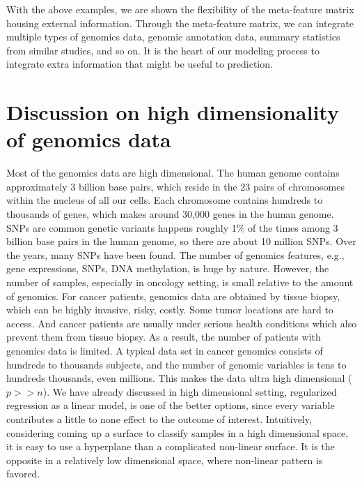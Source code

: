 With the above examples, we are shown the flexibility of the meta-feature matrix housing external information. Through the meta-feature matrix, we can integrate multiple types of genomics data, genomic annotation data, summary statistics from similar studies, and so on. It is the heart of our modeling process to integrate extra information that might be useful to prediction.

\section*{Discussion on high dimensionality of genomics data}
Most of the genomics data are high dimensional. The human genome contains approximately 3 billion base pairs, which reside in the 23 pairs of chromosomes within the nucleus of all our cells. Each chromosome contains hundreds to thousands of genes, which makes around 30,000 genes in the human genome. SNPs are common genetic variants happens roughly 1\% of the times among 3 billion base pairs in the human genome, so there are about 10 million SNPs. Over the years, many SNPs have been found. The number of genomics features, e.g., gene expressions, SNPs, DNA methylation, is huge by nature. However, the number of samples, especially in oncology setting, is small relative to the amount of genomics. For cancer patients, genomics data are obtained by tissue biopsy, which can be highly invasive, risky, costly. Some tumor locations are hard to access. And cancer patients are usually under serious health conditions which also prevent them from tissue biopsy. As a result, the number of patients with genomics data is limited. A typical data set in cancer genomics consists of hundreds to thousands subjects, and the number of genomic variables is tens to hundreds thousands, even millions. This makes the data ultra high dimensional ($p>>n$). We have already discussed in high dimensional setting, regularized regression as a linear model, is one of the better options, since every variable contributes a little to none effect to the outcome of interest. Intuitively, considering coming up a surface to classify samples in a high dimensional space, it is easy to use a hyperplane than a complicated non-linear surface. It is the opposite in a relatively low dimensional space, where non-linear pattern is favored. 

